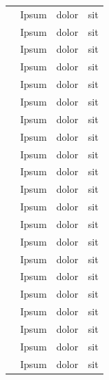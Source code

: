 \documentclass{article}
\begin{document}
\begin{longtable}{p{6.5cm}p{3.5cm}p{0.3cm}p{0.5cm}}
            \citet{Lorem}                 & Ipsum                  & dolor & sit \\
            \citet{Lorem}                 & Ipsum                  & dolor & sit \\
            \citet{Lorem}                 & Ipsum                  & dolor & sit \\
            \citet{Lorem}                 & Ipsum                  & dolor & sit \\
            \citet{Lorem}                 & Ipsum                  & dolor & sit \\
            \citet{Lorem}                 & Ipsum                  & dolor & sit \\
            \citet{Lorem}                 & Ipsum                  & dolor & sit \\
            \citet{Lorem}                 & Ipsum                  & dolor & sit \\
            \citet{Lorem}                 & Ipsum                  & dolor & sit \\
            \citet{Lorem}                 & Ipsum                  & dolor & sit \\
            \citet{Lorem}                 & Ipsum                  & dolor & sit \\
            \citet{Lorem}                 & Ipsum                  & dolor & sit \\
            \citet{Lorem}                 & Ipsum                  & dolor & sit \\
            \citet{Lorem}                 & Ipsum                  & dolor & sit \\
            \citet{Lorem}                 & Ipsum                  & dolor & sit \\
            \citet{Lorem}                 & Ipsum                  & dolor & sit \\
            \citet{Lorem}                 & Ipsum                  & dolor & sit \\
            \citet{Lorem}                 & Ipsum                  & dolor & sit \\
            \citet{Lorem}                 & Ipsum                  & dolor & sit \\
            \citet{Lorem}                 & Ipsum                  & dolor & sit \\
            \citet{Lorem}                 & Ipsum                  & dolor & sit \\

\end{longtable}
\end{document}
